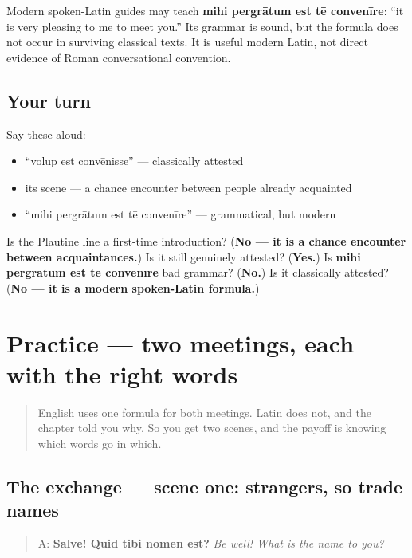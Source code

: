\begin{culture}
Modern spoken-Latin guides may teach \textbf{mihi pergrātum est tē convenīre}: \textquotedblleft{}it is very pleasing to me to meet you.\textquotedblright{} Its grammar is sound, but the formula does not occur in surviving classical texts. It is useful modern Latin, not direct evidence of Roman conversational convention.
\end{culture}

\subsection*{Your turn}
Say these aloud:

\begin{itemize}
\raggedright
  \item \textquotedblleft{}volup est convēnisse\textquotedblright{} — classically attested
  \item its scene — a chance encounter between people already acquainted
  \item \textquotedblleft{}mihi pergrātum est tē convenīre\textquotedblright{} — grammatical, but modern
\end{itemize}

\begin{tcolorbox}[breakable,colback=teal!4,colframe=teal!35!black,title={Before you move on}]
Is the Plautine line a first-time introduction? (\textbf{No — it is a chance encounter between acquaintances.}) Is it still genuinely attested? (\textbf{Yes.}) Is \textbf{mihi pergrātum est tē convenīre} bad grammar? (\textbf{No.}) Is it classically attested? (\textbf{No — it is a modern spoken-Latin formula.})
\end{tcolorbox}
\section[Practice]{Practice — two meetings, each with the right words}

\label{lesson:LA-C21-practice}



\begin{quote}
English uses one formula for both meetings. Latin does not, and the chapter told you why. So you get two scenes, and the payoff is knowing which words go in which.
\end{quote}

\subsection*{The exchange — scene one: strangers, so trade names}
\begin{quote}
A: \textbf{Salvē! Quid tibi nōmen est?} \emph{Be well! What is the name to you?}
\end{quote}

